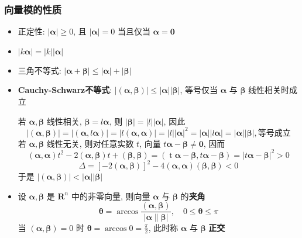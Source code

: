 \documentclass{article}
\begin{document}
				\subsubsection*{向量模的性质}
				\begin{itemize}
					\item 正定性: $|\boldsymbol{\alpha}| \geqslant 0$, 且 $|\boldsymbol{\alpha}|=0$ 当且仅当 $\boldsymbol{\alpha}=\mathbf{0}$
					\item $|k \boldsymbol{\alpha}|=|k||\boldsymbol{\alpha}|$
					\item 三角不等式: $|\boldsymbol{\alpha}+\boldsymbol{\beta}| \leqslant|\boldsymbol{\alpha}|+|\boldsymbol{\beta}|$
					\item \textbf{Cauchy-Schwarz不等式}: $|(\boldsymbol{\alpha}, \boldsymbol{\beta})| \leqslant|\boldsymbol{\alpha}||\boldsymbol{\beta}|$, 等号仅当 $\boldsymbol{\alpha}$ 与 $\boldsymbol{\beta}$ 线性相关时成立

					若 $\boldsymbol{\alpha}, \boldsymbol{\beta}$ 线性相关, $\boldsymbol{\beta}=l \boldsymbol{\alpha}$, 则 $|\boldsymbol{\beta}|=|l||\boldsymbol{\alpha}|$, 因此
					$$
					|(\boldsymbol{\alpha}, \boldsymbol{\beta})|=|(\boldsymbol{\alpha}, l \boldsymbol{\alpha})|=|l(\boldsymbol{\alpha}, 	\boldsymbol{\alpha})|=|l||\boldsymbol{\alpha}|^{2}=|\boldsymbol{\alpha}||l \boldsymbol{\alpha}|=|\boldsymbol{\alpha}||\boldsymbol{\beta}|,\text{等号成立}
					$$
					若 $\boldsymbol{\alpha}, \boldsymbol{\beta}$ 线性无关, 则对任意实数 $t$, 向量 $t \boldsymbol{\alpha}-\boldsymbol{\beta} \neq \mathbf{0}$, 因而
					$$
					(\boldsymbol{\alpha}, \boldsymbol{\alpha}) t^{2}-2(\boldsymbol{\alpha}, \boldsymbol{\beta}) t+(\boldsymbol{\beta}, \boldsymbol{\beta})=(\operatorname{t} 	\boldsymbol{\alpha}-\boldsymbol{\beta}, t \boldsymbol{\alpha}-\boldsymbol{\beta})=|t \boldsymbol{\alpha}-\boldsymbol{\beta}|^{2}>0
					$$
					$$
					\Delta=[-2(\boldsymbol{\alpha}, \boldsymbol{\beta})]^{2}-4(\boldsymbol{\alpha}, \boldsymbol{\alpha})(\boldsymbol{\beta}, \boldsymbol{\beta})<0
					$$
					于是 $|(\boldsymbol{\alpha}, \boldsymbol{\beta})|<|\boldsymbol{\alpha}||\boldsymbol{\beta}|$
					\item 设 $\boldsymbol{\alpha}, \boldsymbol{\beta}$ 是 $\mathbf{R}^{n}$ 中的非零向量, 则向量 $\boldsymbol{\alpha}$ 与 $\boldsymbol{\beta}$ 的\textbf{夹角}
					$$
					\boldsymbol\theta=\arccos \frac{(\boldsymbol{\alpha}, \boldsymbol{\beta})}{|\boldsymbol{\alpha} \| \boldsymbol{\beta}|}, \quad 0 \leqslant \boldsymbol\theta \leqslant \pi
					$$
					当 $(\boldsymbol{\alpha}, \boldsymbol{\beta})=0$ 时 $\boldsymbol\theta=\arccos 0=\frac{\pi}{2}$, 此时称 $\boldsymbol{\alpha}$ 与 $\boldsymbol{\beta}$ \textbf{正交}
				\end{itemize}
\end{document}
